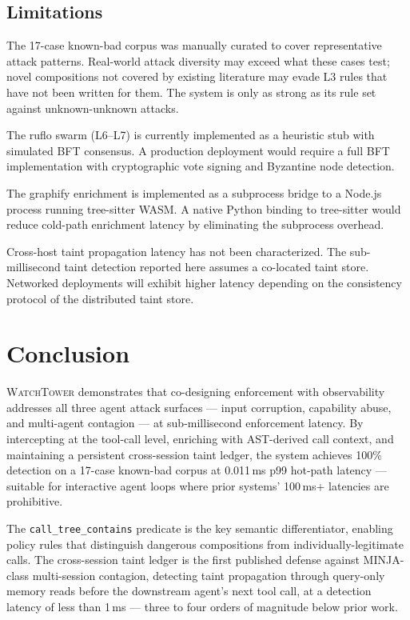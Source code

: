\documentclass[conference]{IEEEtran}
\begin{document}
\subsection{Limitations}

The 17-case known-bad corpus was manually curated to cover representative
attack patterns. Real-world attack diversity may exceed what these cases
test; novel compositions not covered by existing literature may evade L3
rules that have not been written for them. The system is only as strong as
its rule set against unknown-unknown attacks.

The ruflo swarm (L6--L7) is currently implemented as a heuristic stub
with simulated BFT consensus. A production deployment would require a
full BFT implementation with cryptographic vote signing and Byzantine node
detection.

The graphify enrichment is implemented as a subprocess bridge to a
Node.js process running tree-sitter WASM. A native Python binding to
tree-sitter would reduce cold-path enrichment latency by eliminating the
subprocess overhead.

Cross-host taint propagation latency has not been characterized. The
sub-millisecond taint detection reported here assumes a co-located taint
store. Networked deployments will exhibit higher latency depending on the
consistency protocol of the distributed taint store.

\section{Conclusion}
\label{sec:conclusion}

\textsc{WatchTower} demonstrates that co-designing enforcement with
observability addresses all three agent attack surfaces --- input
corruption, capability abuse, and multi-agent contagion --- at
sub-millisecond enforcement latency. By intercepting at the tool-call
level, enriching with AST-derived call context, and maintaining a
persistent cross-session taint ledger, the system achieves 100\% detection
on a 17-case known-bad corpus at 0.011\,ms p99 hot-path latency ---
suitable for interactive agent loops where prior systems' 100\,ms+
latencies are prohibitive.

The \texttt{call\_tree\_contains} predicate is the key semantic
differentiator, enabling policy rules that distinguish dangerous
compositions from individually-legitimate calls. The cross-session taint
ledger is the first published defense against MINJA-class multi-session
contagion, detecting taint propagation through query-only memory reads
before the downstream agent's next tool call, at a detection latency of
less than 1\,ms --- three to four orders of magnitude below prior work.
\end{document}

